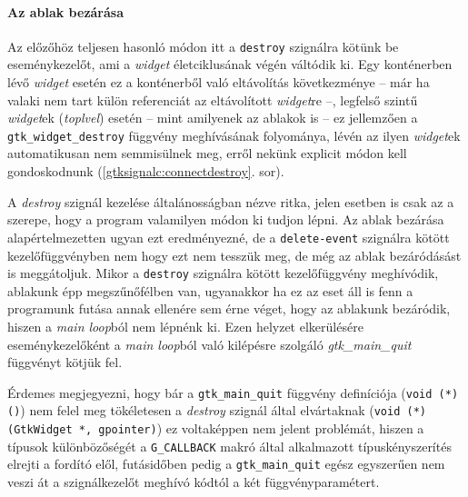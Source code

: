 \paragraph{Az ablak bezárása}

\begin{description}
 \item[\ref{gtksignalc:signaldestroy}. sor] Az előzőhöz teljesen hasonló módon itt a \texttt{destroy} szignálra kötünk be eseménykezelőt, ami a \textit{widget} életciklusának végén váltódik ki. Egy konténerben lévő \textit{widget} esetén ez a konténerből való eltávolítás következménye -- már ha valaki nem tart külön referenciát az eltávolított \textit{widget}re --, legfelső szintű \textit{widget}ek (\textit{toplvel}) esetén -- mint amilyenek az ablakok is -- ez jellemzően a \texttt{gtk\_widget\_destroy} függvény meghívásának folyománya, lévén az ilyen \textit{widget}ek automatikusan nem semmisülnek meg, erről nekünk explicit módon kell gondoskodnunk (\ref{gtksignalc:connectdestroy}. sor).

  A \textit{destroy} szignál kezelése általánosságban nézve ritka, jelen esetben is csak az a szerepe, hogy a program valamilyen módon ki tudjon lépni. Az ablak bezárása alapértelmezetten ugyan ezt eredményezné, de a \texttt{delete-event} szignálra kötött kezelőfüggvényben nem hogy ezt nem tesszük meg, de még az ablak bezáródásást is meggátoljuk. Mikor a \texttt{destroy} szignálra kötött kezelőfüggvény meghívódik, ablakunk épp megszűnőfélben van, ugyanakkor ha ez az eset áll is fenn a programunk futása annak ellenére sem érne véget, hogy az ablakunk bezáródik, hiszen a \textit{main loop}ból nem lépnénk ki. Ezen helyzet elkerülésére eseménykezelőként a \textit{main loop}ból való kilépésre szolgáló \textit{gtk\_main\_quit} függvényt kötjük fel.

 Érdemes megjegyezni, hogy bár a \texttt{gtk\_main\_quit} függvény definíciója (\texttt{void (*) ()}) nem felel meg tökéletesen a \textit{destroy} szignál által elvártaknak (\texttt{void (*) (GtkWidget *, gpointer)}) ez voltaképpen nem jelent problémát, hiszen a típusok különbözőségét a \texttt{G\_CALLBACK} makró által alkalmazott típuskényszerítés elrejti a fordító elől, futásidőben pedig a \texttt{gtk\_main\_quit} egész egyszerűen nem veszi át a szignálkezelőt meghívó kódtól a két függvényparamétert.


\end{description}
